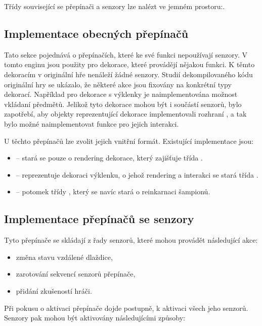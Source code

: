 Třídy související se přepínači a senzory lze nalézt ve jemném prostoru:\newline {}.

\subsection{Implementace obecných přepínačů}\label{general-sensors}
Tato sekce pojednává o přepínačích, které ke své funkci nepoužívají senzory. V tomto enginu jsou použity pro 
dekorace, které provádějí nějakou funkci. K těmto dekoracím v originální hře nenáleží žádné senzory. 
Studií dekompilovaného kódu originální hry \cite{DMDecompilation} se ukázalo, že některé akce jsou fixovány 
na konkrétní typy dekorací. Například pro dekorace s výklenky je naimplementována možnost vkládaní předmětů.
Jelikož tyto dekorace mohou být i součástí senzorů, bylo zapotřebí, aby objekty reprezentující dekorace
implementovali rozhraní , a tak bylo možné naimplementovat funkce pro jejich interakci.

U těchto přepínačů lze zvolit jejich vnitřní formát. Existující implementace jsou:
\begin{itemize}
\item {} -- stará se pouze o rendering dekorace, který zajišťuje třída . 
\item {} -- reprezentuje dekoraci výklenku, o jehož rendering a interakci se stará třída . 
\item {} -- potomek třídy , který se navíc stará o reinkarnaci šampionů.
\end{itemize}

\subsection{Implementace přepínačů se senzory}
Tyto přepínače se skládají z řady senzorů, které mohou provádět následující akce:

\begin{itemize}
\item změna stavu vzdálené dlaždice,
\item zarotování sekvencí senzorů přepínače,
\item přidání zkušeností hráči.
\end{itemize}

Při pokusu o aktivaci přepínače dojde postupně, k aktivaci všech jeho senzorů.
Senzory pak mohou být aktivovány následujícími způsoby:

